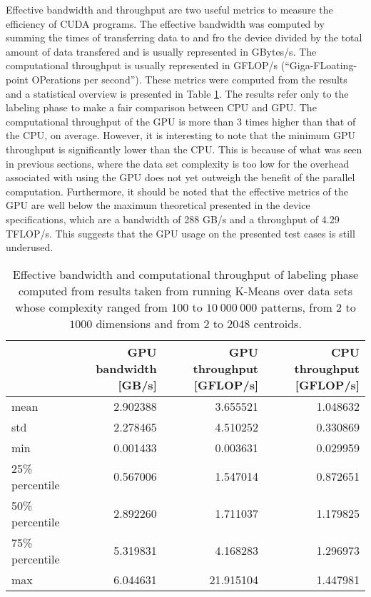Effective bandwidth and throughput are two useful metrics to measure the efficiency of CUDA programs.
The effective bandwidth was computed by summing the times of transferring data to and fro the device divided by the total amount of data transfered and is usually represented in GBytes/s.
The computational throughput is usually represented in GFLOP/s (“Giga-FLoating-point OPerations per second”).
These metrics were computed from the results and a statistical overview is presented in Table \ref{tab:kmeans performance metrics}.
The results refer only to the labeling phase to make a fair comparison between CPU and GPU.
The computational throughput of the GPU is more than 3 times higher than that of the CPU, on average.
However, it is interesting to note that the minimum GPU throughput is significantly lower than the CPU.
This is because of what was seen in previous sections, where the data set complexity is too low for the overhead associated with using the GPU does not yet outweigh the benefit of the parallel computation.
Furthermore, it should be noted that the effective metrics of the GPU are well below the maximum theoretical presented in the device specifications, which are a bandwidth of 288 GB/s and a throughput of 4.29 TFLOP/s.
This suggests that the GPU usage on the presented test cases is still underused.

\begin{table}[ht]
\centering
\caption{Effective bandwidth and computational throughput of labeling phase computed from results taken from running K-Means over data sets whose complexity ranged from $100$ to $10 \: 000 \: 000$ patterns, from $2$ to $1000$ dimensions and from $2$ to $2048$ centroids.}

\begin{tabular}{lrrr}
\toprule
{} &  GPU bandwidth [GB/s] &  GPU throughput [GFLOP/s] &  CPU throughput [GFLOP/s] \\
\midrule
mean             &         2.902388 &    3.655521 &        1.048632 \\
std              &         2.278465 &    4.510252 &        0.330869 \\
min              &         0.001433 &    0.003631 &        0.029959 \\
25\% percentile &         0.567006 &    1.547014 &        0.872651 \\
50\% percentile  &         2.892260 &    1.711037 &        1.179825 \\
75\% percentile  &         5.319831 &    4.168283 &        1.296973 \\
max             &         6.044631 &   21.915104 &        1.447981 \\
\bottomrule
\end{tabular}

\label{tab:kmeans performance metrics}
\end{table}

